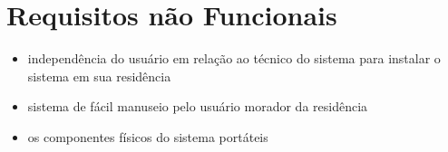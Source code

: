 \section{Requisitos não Funcionais}

\begin{itemize}
	\item{independência do usuário em relação ao técnico do sistema para instalar o sistema em sua residência}
	\item{sistema de fácil manuseio pelo usuário morador da residência}
	\item{os componentes físicos do sistema portáteis}
\end{itemize}



